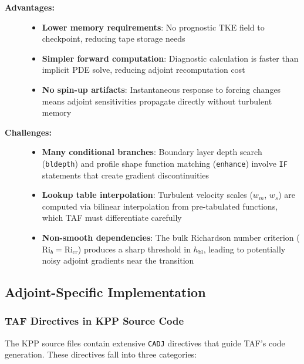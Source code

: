 \documentclass[12pt,letterpaper]{article}
\begin{document}
\begin{description}
  \item[\textbf{Advantages:}]
  \begin{itemize}[leftmargin=*]
    \item \textbf{Lower memory requirements}: No prognostic TKE field to checkpoint,
          reducing tape storage needs
    \item \textbf{Simpler forward computation}: Diagnostic calculation is faster
          than implicit PDE solve, reducing adjoint recomputation cost
    \item \textbf{No spin-up artifacts}: Instantaneous response to forcing changes
          means adjoint sensitivities propagate directly without turbulent memory
  \end{itemize}

  \item[\textbf{Challenges:}]
  \begin{itemize}[leftmargin=*]
    \item \textbf{Many conditional branches}: Boundary layer depth search
          (\texttt{bldepth}) and profile shape function matching (\texttt{enhance})
          involve \texttt{IF} statements that create gradient discontinuities
    \item \textbf{Lookup table interpolation}: Turbulent velocity scales ($w_m$, $w_s$)
          are computed via bilinear interpolation from pre-tabulated functions, which
          TAF must differentiate carefully
    \item \textbf{Non-smooth dependencies}: The bulk Richardson number criterion
          ($\text{Ri}_b = \text{Ri}_{\text{cr}}$) produces a sharp threshold in
          $h_{\text{bl}}$, leading to potentially noisy adjoint gradients near the
          transition
  \end{itemize}
\end{description}

\subsection{Adjoint-Specific Implementation}

\subsubsection{TAF Directives in KPP Source Code}

The KPP source files contain extensive \texttt{CADJ} directives that guide TAF's
code generation. These directives fall into three categories:
\end{document}
